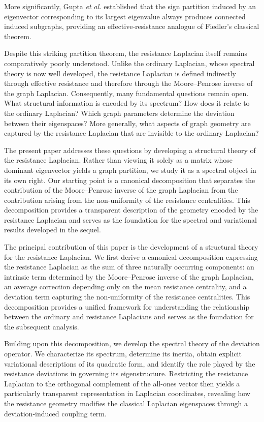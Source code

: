 \documentclass[12pt,a4paper]{amsart}
\theoremstyle{remark}
\theoremstyle{definition}
\newcommand{\1}{\mathbf{1}}
\newcommand{\0}{\mathbf{0}}
\begin{document}
More significantly, Gupta \emph{et al.} \cite[Theorem 3.1]{gupta} established that the sign partition induced by an eigenvector corresponding to its largest eigenvalue always produces connected induced subgraphs, providing an effective-resistance analogue of Fiedler's classical theorem.

Despite this striking partition theorem, the resistance Laplacian itself remains comparatively poorly understood. Unlike the ordinary Laplacian, whose spectral theory is now well developed, the resistance Laplacian is defined indirectly through effective resistance and therefore through the Moore--Penrose inverse of the graph Laplacian. Consequently, many fundamental questions remain open. What structural information is encoded by its spectrum? How does it relate to the ordinary Laplacian? Which graph parameters determine the deviation between their eigenspaces? More generally, what aspects of graph geometry are captured by the resistance Laplacian that are invisible to the ordinary Laplacian?

The present paper addresses these questions by developing a structural theory of the resistance Laplacian. Rather than viewing it solely as a matrix whose dominant eigenvector yields a graph partition, we study it as a spectral object in its own right. Our starting point is a canonical decomposition that separates the contribution of the Moore--Penrose inverse of the graph Laplacian from the contribution arising from the non-uniformity of the resistance centralities. This decomposition provides a transparent description of the geometry encoded by the resistance Laplacian and serves as the foundation for the spectral and variational results developed in the sequel.

The principal contribution of this paper is the development of a structural theory for the resistance Laplacian. We first derive a canonical decomposition expressing the resistance Laplacian as the sum of three naturally occurring components: an intrinsic term determined by the Moore--Penrose inverse of the graph Laplacian, an average correction depending only on the mean resistance centrality, and a deviation term capturing the non-uniformity of the resistance centralities. This decomposition provides a unified framework for understanding the relationship between the ordinary and resistance Laplacians and serves as the foundation for the subsequent analysis.

Building upon this decomposition, we develop the spectral theory of the deviation operator. We characterize its spectrum, determine its inertia, obtain explicit variational descriptions of its quadratic form, and identify the role played by the resistance deviations in governing its eigenstructure. Restricting the resistance Laplacian to the orthogonal complement of the all-ones vector then yields a particularly transparent representation in Laplacian coordinates, revealing how the resistance geometry modifies the classical Laplacian eigenspaces through a deviation-induced coupling term.
\end{document}
